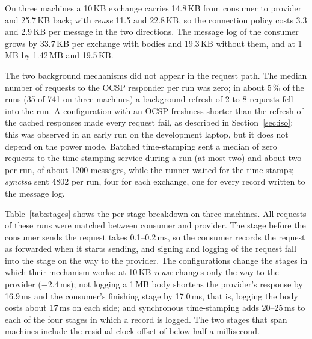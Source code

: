 \documentclass[conference,a4paper]{IEEEtran}
\begin{document}
On three machines a 10\,KB exchange carries 14.8\,KB from consumer to provider and 25.7\,KB back;
with \emph{reuse} 11.5 and 22.8\,KB, so the connection policy costs 3.3 and 2.9\,KB per message in the
two directions. The message log of the consumer grows by 33.7\,KB per exchange with bodies and
19.3\,KB without them, and at 1\,MB by 1.42\,MB and 19.5\,KB.

The two background mechanisms did not appear in the request path. The median number of requests to
the OCSP responder per run was zero; in about 5\,\% of the runs (35 of 741 on three machines) a
background refresh of 2 to 8 requests fell into the run. A configuration with an OCSP freshness
shorter than the refresh of the cached responses made every request fail, as described in
Section~\ref{sec:iso}; this was observed in an early run on the development laptop, but it does not depend on
the power mode. Batched time-stamping sent a median of zero requests to the time-stamping service
during a run (at most two) and about two per run, of about 1200 messages, while the runner waited for
the time stamps; \emph{synctsa} sent 4802 per run, four for each exchange, one for
every record written to the message log.

Table~\ref{tab:stages} shows the per-stage breakdown on three machines. All requests of these runs
were matched between consumer and provider. The stage before the consumer sends the request takes
0.1--0.2\,ms, so the consumer records the request as forwarded when it starts sending, and signing and
logging of the request fall into the stage on the way to the provider. The configurations change the
stages in which their mechanism works: at 10\,KB \emph{reuse} changes only the way to the provider ($-2.4$\,ms);
not logging a 1\,MB body shortens the provider's response by 16.9\,ms and the consumer's finishing
stage by 17.0\,ms, that is, logging the body costs about 17\,ms on each side; and synchronous
time-stamping adds 20--25\,ms to each of the four stages in which a record is logged. The two stages
that span machines include the residual clock offset of below half a millisecond.
\end{document}
